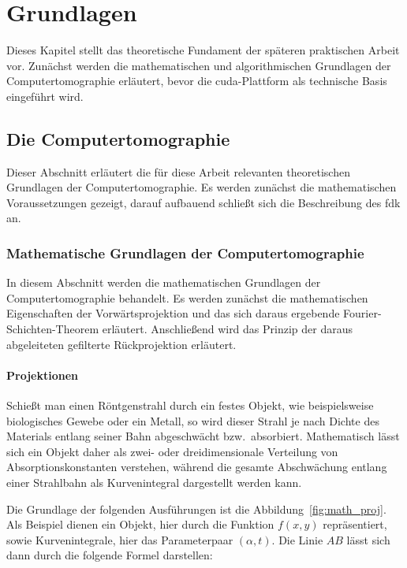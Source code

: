 \chapter{Grundlagen}\label{chap:grundlagen}

Dieses Kapitel stellt das theoretische Fundament der späteren praktischen Arbeit vor. Zunächst werden die
mathematischen und algorithmischen Grundlagen der Computertomographie erläutert, bevor die \gls{cuda}-Plattform als
technische Basis eingeführt wird.

\section{Die Computertomographie}

Dieser Abschnitt erläutert die für diese Arbeit relevanten theoretischen Grundlagen der Computertomographie. Es werden
zunächst die mathematischen Voraussetzungen gezeigt, darauf aufbauend schließt sich die Beschreibung des \gls{fdk} an.

\subsection{Mathematische Grundlagen der Computertomographie}

In diesem Abschnitt werden die mathematischen Grundlagen der Computertomographie behandelt. Es werden zunächst die
mathematischen Eigenschaften der Vorwärtsprojektion und das sich daraus ergebende Fourier-Schichten-Theorem erläutert.
Anschließend wird das Prinzip der daraus abgeleiteten gefilterte Rückprojektion erläutert.
\subsubsection{Projektionen}

Schießt man einen Röntgenstrahl durch ein festes Objekt, wie beispielsweise biologisches Gewebe oder ein Metall, so wird
dieser Strahl je nach Dichte des Materials entlang seiner Bahn abgeschwächt bzw.\ absorbiert. Mathematisch lässt sich
ein Objekt daher als zwei- oder dreidimensionale Verteilung von Absorptionskonstanten verstehen, während die gesamte
Abschwächung entlang einer Strahlbahn als Kurvenintegral dargestellt werden kann.

Die Grundlage der folgenden Ausführungen ist die Abbildung~\ref{fig:math_proj}. Als Beispiel dienen ein Objekt, hier
durch die Funktion $f(x, y)$ repräsentiert, sowie Kurvenintegrale, hier das Parameterpaar $(\alpha, t)$. Die Linie $AB$
lässt sich dann durch die folgende Formel darstellen:


